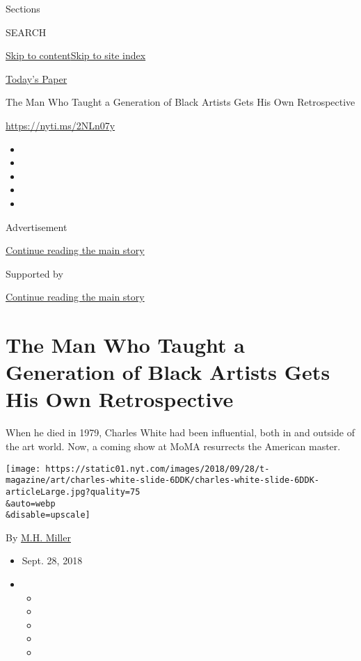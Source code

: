 Sections

SEARCH

\protect\hyperlink{site-content}{Skip to
content}\protect\hyperlink{site-index}{Skip to site index}

\href{https://myaccount.nytimes.com/auth/login?response_type=cookie\&client_id=vi}{}

\href{https://www.nytimes.com/section/todayspaper}{Today's Paper}

The Man Who Taught a Generation of Black Artists Gets His Own
Retrospective

\href{https://nyti.ms/2NLn07y}{https://nyti.ms/2NLn07y}

\begin{itemize}
\item
\item
\item
\item
\item
\end{itemize}

Advertisement

\protect\hyperlink{after-top}{Continue reading the main story}

Supported by

\protect\hyperlink{after-sponsor}{Continue reading the main story}

\hypertarget{the-man-who-taught-a-generation-of-black-artists-gets-his-own-retrospective}{%
\section{The Man Who Taught a Generation of Black Artists Gets His Own
Retrospective}\label{the-man-who-taught-a-generation-of-black-artists-gets-his-own-retrospective}}

When he died in 1979, Charles White had been influential, both in and
outside of the art world. Now, a coming show at MoMA resurrects the
American master.

\texttt{[image: https://static01.nyt.com/images/2018/09/28/t-magazine/art/charles-white-slide-6DDK/charles-white-slide-6DDK-articleLarge.jpg?quality=75\\\&auto=webp\\\&disable=upscale]}

By \href{https://www.nytimes.com/by/m-h-miller}{M.H. Miller}

\begin{itemize}
\item
  Sept. 28, 2018
\item
  \begin{itemize}
  \item
  \item
  \item
  \item
  \item
  \end{itemize}
\end{itemize}

